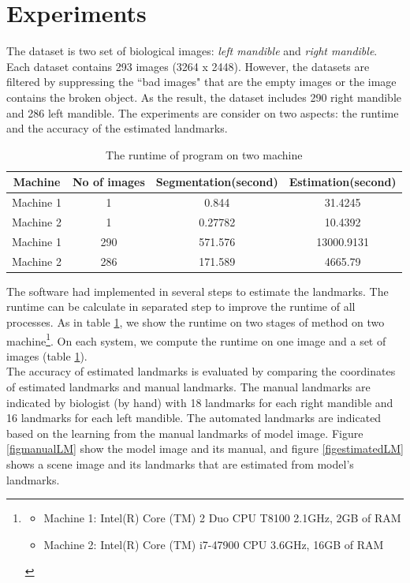 \section{Experiments}
The dataset is two set of biological images: \textit{left mandible} and \textit{right mandible}. Each dataset contains 293 images (3264 x 2448). However, the datasets are filtered by suppressing the ``bad images" that are the empty images or the image contains the broken object. As the result, the dataset includes 290 right mandible and 286 left mandible. The experiments are consider on two aspects: the runtime and the accuracy of the estimated landmarks.
\begin{table}[!h]
	\centering
	\begin{tabular}{|c|c|c|c|}
		\hline
		Machine & No of images & Segmentation(second) & Estimation(second) \\ \hline
		Machine 1 & 1 & 0.844 & 31.4245   \\ \hline
		Machine 2 & 1 & 0.27782 & 10.4392 \\ \hline
		Machine 1 & 290 & 571.576 & 13000.9131   \\ \hline
		Machine 2 & 286 & 171.589 & 4665.79\\ \hline
	\end{tabular}	
	\caption{The runtime of program on two machine}		
	\label{table_runtime}
\end{table}
The software had implemented in several steps to estimate the landmarks. The runtime can be calculate in separated step to improve the runtime of all processes. As in table \ref{table_runtime}, we show the runtime on two stages of method on two machine\footnote{
	\begin{itemize}
		\item Machine 1: Intel(R) Core (TM) 2 Duo CPU T8100 2.1GHz, 2GB of RAM
		\item Machine 2: Intel(R) Core (TM) i7-47900 CPU 3.6GHz, 16GB of RAM
	\end{itemize}
}. On each system, we compute the runtime on one image and a set of images (table \ref{table_runtime}).\\[0.2cm]
The accuracy of estimated landmarks is evaluated by comparing the coordinates of estimated landmarks and manual landmarks. The manual landmarks are indicated by biologist (by hand) with 18 landmarks for each right mandible and 16 landmarks for each left mandible. The automated landmarks are indicated based on the learning from the manual landmarks of model image. Figure \ref{figmanualLM} show the model image and its manual, and figure \ref{figestimatedLM} shows a scene image and its landmarks that are estimated from model's landmarks. 
